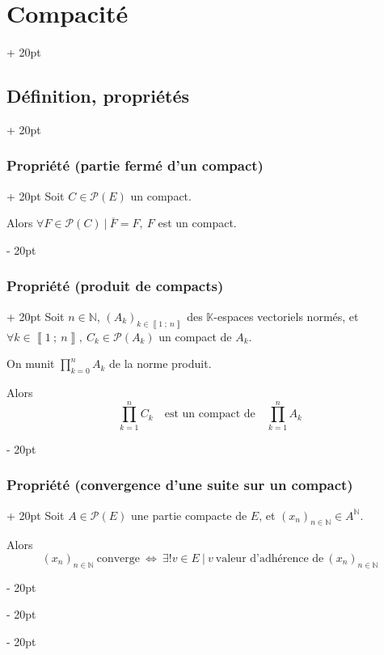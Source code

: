 \documentclass[a4paper, 12pt, twoside]{article}
\newcommand{\N}{\mathbb{N}} %
\newcommand{\K}{\mathbb K}
\newcommand{\nset}[2]{\left\llbracket #1\ ;\ #2 \right\rrbracket}
\newcommand{\cj}[1]{\overline{#1}} %
\newcommand{\lr}[1]{\left( #1 \right)}
\newcommand{\ssi}{\ \Leftrightarrow \ }
\newcommand{\ind}[1][20pt]{\advance\leftskip + #1}
\newcommand{\deind}[1][20pt]{\advance\leftskip - #1}
\newenvironment{indt}[2][20pt]{#2 \par \ind[#1]}{\par \deind} %
\begin{document}
\begin{indt}{\section{Compacité}}
\begin{indt}{\subsection{Définition, propriétés}}
            \vspace{12pt}
            
            \begin{indt}{\subsubsection{Propriété (partie fermé d'un compact)}}
                Soit $C \in \mathcal P(E)$ un compact.

                Alors $\forall F \in \mathcal P(C)\ |\ \cj F = F,\ F$ est un compact.
            \end{indt}

            \vspace{12pt}
            
            \begin{indt}{\subsubsection{Propriété (produit de compacts)}}
                Soit $n \in \N$, $\lr{A_k}_{k \in \nset 1 n}$ des $\K$-espaces vectoriels normés, et $\forall k \in \nset 1 n,\ C_k \in \mathcal P(A_k)$ un compact de $A_k$.

                On munit $\displaystyle \prod_{k = 0}^n A_k$ de la norme produit.

                Alors
                \[
                    \prod_{k = 1}^n C_k
                    \quad \text{est un compact de} \quad
                    \prod_{k = 1}^n A_k
                \]
            \end{indt}

            \vspace{12pt}
            
            \begin{indt}{\subsubsection{Propriété (convergence d'une suite sur un compact)}}
                Soit $A \in \mathcal P(E)$ une partie compacte de $E$, et $\lr{x_n}_{n \in \N} \in A^\N$.

                Alors
                \[
                    \lr{x_n}_{n \in \N}\ \text{converge}
                    \ssi
                    \exists! v \in E\ |\ v\ \text{valeur d'adhérence de}\ \lr{x_n}_{n \in \N}
                \]
            \end{indt}
        \end{indt}


\end{indt}
\end{document}
